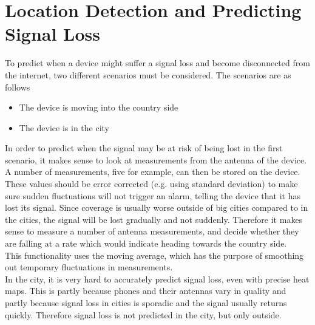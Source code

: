 \section{Location Detection and Predicting Signal Loss}
To predict when a device might suffer a signal loss and become disconnected from the internet, two different scenarios must be considered. The scenarios are as follows\\

\begin{itemize}
\item The device is moving into the country side
\item The device is in the city
\end{itemize}

In order to predict when the signal may be at risk of being lost in the first scenario, it makes sense to look at measurements from the antenna of the device. A number of measurements, five for example, can then be stored on the device. These values should be error corrected (e.g. using standard deviation) to make sure sudden fluctuations will not trigger an alarm, telling the device that it has lost its signal. Since coverage is usually worse outside of big cities compared to in the cities, the signal will be lost gradually and not suddenly. Therefore it makes sense to measure a number of antenna measurements, and decide whether they are falling at a rate which would indicate heading towards the country side.\\

This functionality uses the moving average, which has the purpose of smoothing out temporary fluctuations in measurements. \citep{wiki-moving-average}\\

In the city, it is very hard to accurately predict signal loss, even with precise heat maps. This is partly because phones and their antennas vary in quality and partly because signal loss in cities is sporadic and the signal usually returns quickly. Therefore signal loss is not predicted in the city, but only outside. 